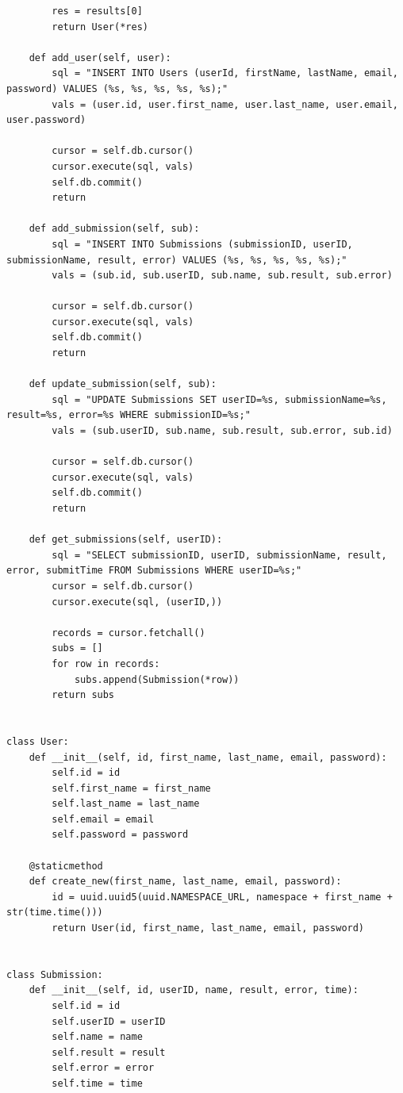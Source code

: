 \documentclass[12pt, letterpaper]{article}
\begin{document}
\begin{verbatim}
        res = results[0]
        return User(*res)

    def add_user(self, user):
        sql = "INSERT INTO Users (userId, firstName, lastName, email, password) VALUES (%s, %s, %s, %s, %s);"
        vals = (user.id, user.first_name, user.last_name, user.email, user.password)

        cursor = self.db.cursor()
        cursor.execute(sql, vals)
        self.db.commit()
        return

    def add_submission(self, sub):
        sql = "INSERT INTO Submissions (submissionID, userID, submissionName, result, error) VALUES (%s, %s, %s, %s, %s);"
        vals = (sub.id, sub.userID, sub.name, sub.result, sub.error)

        cursor = self.db.cursor()
        cursor.execute(sql, vals)
        self.db.commit()
        return

    def update_submission(self, sub):
        sql = "UPDATE Submissions SET userID=%s, submissionName=%s, result=%s, error=%s WHERE submissionID=%s;"
        vals = (sub.userID, sub.name, sub.result, sub.error, sub.id)

        cursor = self.db.cursor()
        cursor.execute(sql, vals)
        self.db.commit()
        return

    def get_submissions(self, userID):
        sql = "SELECT submissionID, userID, submissionName, result, error, submitTime FROM Submissions WHERE userID=%s;"
        cursor = self.db.cursor()
        cursor.execute(sql, (userID,))

        records = cursor.fetchall()
        subs = []
        for row in records:
            subs.append(Submission(*row))
        return subs


class User:
    def __init__(self, id, first_name, last_name, email, password):
        self.id = id
        self.first_name = first_name
        self.last_name = last_name
        self.email = email
        self.password = password

    @staticmethod
    def create_new(first_name, last_name, email, password):
        id = uuid.uuid5(uuid.NAMESPACE_URL, namespace + first_name + str(time.time()))
        return User(id, first_name, last_name, email, password)


class Submission:
    def __init__(self, id, userID, name, result, error, time):
        self.id = id
        self.userID = userID
        self.name = name
        self.result = result
        self.error = error
        self.time = time


\end{verbatim}
\end{document}
